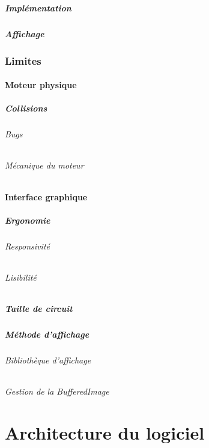 \documentclass{report}
\begin{document}
\paragraph{Implémentation}

\paragraph{Affichage}

\subsection{Limites}

\subsubsection{Moteur physique}

\paragraph{Collisions}

\subparagraph{Bugs}

\subparagraph{Mécanique du moteur}

\subsubsection{Interface graphique}

\paragraph{Ergonomie}

\subparagraph{Responsivité}

\subparagraph{Lisibilité}

\paragraph{Taille de circuit}

\paragraph{Méthode d'affichage}

\subparagraph{Bibliothèque d'affichage}

\subparagraph{Gestion de la BufferedImage}

\chapter{Architecture du logiciel}
\end{document}
